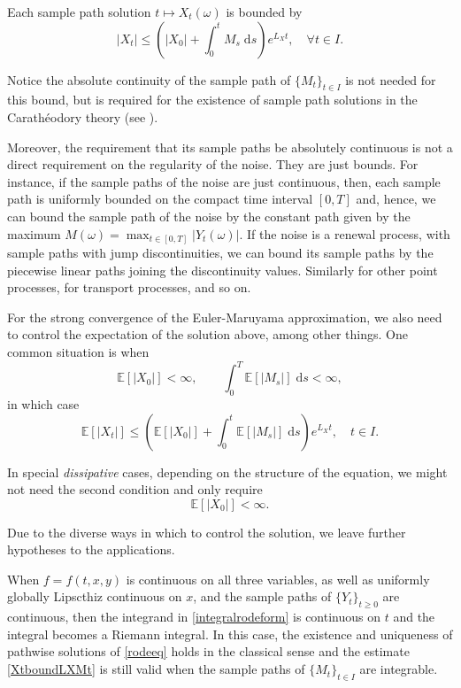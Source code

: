 \documentclass[reqno,12pt]{amsart}
\theoremstyle{plain}%
\theoremstyle{definition}
\begin{document}
Each sample path solution $t \mapsto X_t(\omega)$ is bounded by
\begin{equation}
    \label{XtboundLXMt}
    |X_t| \leq \left(|X_0| + \int_0^t M_s\;\mathrm{d}s\right) e^{L_X t}, \quad \forall t\in I.
\end{equation}

Notice the absolute continuity of the sample path of $\{M_t\}_{t\in I}$ is not needed for this bound, but is required for the existence of sample path solutions in the Carath\'eodory theory (see \cite[Theorem 2.3]{HanKloeden2017}).

Moreover, the requirement that its sample paths be absolutely continuous is not a direct requirement on the regularity of the noise. They are just bounds. For instance, if the sample paths of the noise are just continuous, then, each sample path is uniformly bounded on the compact time interval $[0, T]$ and, hence, we can bound the sample path of the noise by the constant path given by the maximum $M(\omega) = \max_{t\in [0, T]}|Y_t(\omega)|$. If the noise is a renewal process, with sample paths with jump discontinuities, we can bound its sample paths by the piecewise linear paths joining the discontinuity values. Similarly for other point processes, for transport processes, and so on.

For the strong convergence of the Euler-Maruyama approximation, we also need to control the expectation of the solution above, among other things. One common situation is when
\[
    \mathbb{E}[|X_0|] < \infty, \qquad \int_0^T \mathbb{E}[|M_s|] \;\mathrm{d}s < \infty,
\]
in which case
\[
    \mathbb{E}[|X_t|] \leq \left(\mathbb{E}[|X_0|] + \int_0^t \mathbb{E}[|M_s|]\;\mathrm{d}s\right) e^{L_X t}, \quad t\in I.
\]

In special \emph{dissipative} cases, depending on the structure of the equation, we might not need the second condition and only require
\[
    \mathbb{E}[|X_0|] < \infty.
\]

Due to the diverse ways in which to control the solution, we leave further hypotheses to the applications.

When $f=f(t, x, y)$ is continuous on all three variables, as well as uniformly globally Lipscthiz continuous on $x$, and the sample paths of $\{Y_t\}_{t\geq 0}$ are continuous, then the integrand in \eqref{integralrodeform} is continuous on $t$ and the integral becomes a Riemann integral. In this case, the existence and uniqueness of pathwise solutions of \eqref{rodeeq} holds in the classical sense and the estimate \eqref{XtboundLXMt} is still valid when the sample paths of $\{M_t\}_{t\in I}$ are integrable.
\end{document}
